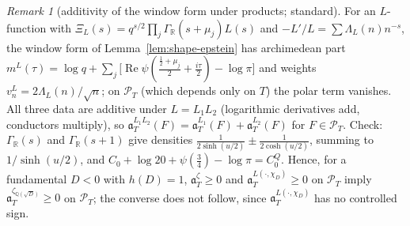 \documentclass[11pt]{amsart}
\theoremstyle{definition}
\theoremstyle{remark}
\newtheorem{remark}[theorem]{Remark}
\newcommand{\R}{\mathbb R}
\newcommand{\Q}{\mathbb Q}
\newcommand{\Rel}{\operatorname{Re}}
\newcommand{\PT}{\mathcal P_T}
\begin{document}
\begin{remark}[additivity of the window form under products; standard]\label{rem:shape-additive}
For an $L$-function with $\Xi_L(s)=q^{s/2}\prod_j\Gamma_\R(s+\mu_j)L(s)$ and $-L'/L=\sum\Lambda_L(n)n^{-s}$, the window form
of Lemma~\ref{lem:shape-epstein} has archimedean part $m^L(\tau)=\log q+\sum_j\big[\Rel\psi(\frac{\frac12+\mu_j}2+\frac{i\tau}2)-\log\pi\big]$
and weights $v^L_n=2\Lambda_L(n)/\sqrt n$; on $\PT$ (which depends only on $T$) the polar term vanishes. All three data are additive under
$L=L_1L_2$ (logarithmic derivatives add, conductors multiply), so $\mathfrak a_T^{L_1L_2}(F)=\mathfrak a_T^{L_1}(F)+\mathfrak a_T^{L_2}(F)$ for
$F\in\PT$. Check: $\Gamma_\R(s)$ and $\Gamma_\R(s+1)$ give densities $\frac1{2\sinh(u/2)}\pm\frac1{2\cosh(u/2)}$, summing to $1/\sinh(u/2)$, and
$C_0+\log20+\psi(\frac34)-\log\pi=C_0^Q$. Hence, for a fundamental $D<0$ with $h(D)=1$, $\mathfrak a_T^{\zeta}\ge0$ and $\mathfrak a_T^{L(\cdot,\chi_D)}\ge0$
on $\PT$ imply $\mathfrak a_T^{\zeta_{\Q(\sqrt D)}}\ge0$ on $\PT$; the converse does not follow, since $\mathfrak a_T^{L(\cdot,\chi_D)}$ has no
controlled sign.
\end{remark}
\end{document}
